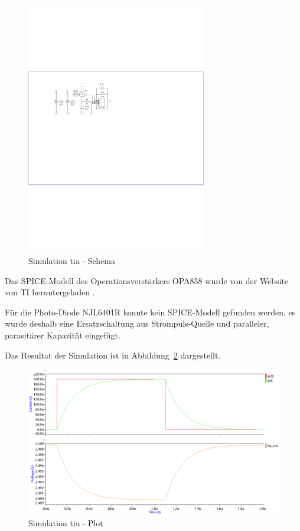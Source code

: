 \begin{figure}[H]
    \centering
    \includegraphics[trim=80 465 310 265, clip, width=0.7\textwidth]{attachments/simulation_tia_schematic.pdf}
    \caption{Simulation \acrshort{tia} - Schema}\label{fig:simulation_tia_schematic}
\end{figure}

Das SPICE-Modell des Operationsverstärkers OPA858 wurde von der Website von TI heruntergeladen \cite{ti2024opa858}.

Für die Photo-Diode NJL6401R konnte kein SPICE-Modell gefunden werden, es wurde deshalb eine Ersatzschaltung aus
Strompuls-Quelle und paralleler, parasitärer Kapazität eingefügt.

Das Resultat der Simulation ist in Abbildung~\ref{fig:simulation_tia_plot} dargestellt.

\begin{figure}[H]
    \centering
    \includegraphics[width=\textwidth]{graphics/simulation_tia_plot.png}
    \caption{Simulation \acrshort{tia} - Plot}\label{fig:simulation_tia_plot}
\end{figure}

